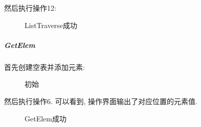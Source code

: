 \documentclass[supercite]{Experimental_Report}
\theoremstyle{definition}
\begin{document}
\clearpage
\noindent
然后执行操作12:
\begin{figure}[htbp]
	\centering
	\centering
	\caption{ListTraverse成功}
	\label{fig1-21}
\end{figure}

\subparagraph{GetElem}
\noindent
首先创建空表并添加元素:
\begin{figure}[htbp]
	\centering
	\centering
	\centering
	\caption{初始}
	\label{fig1-22}
\end{figure}

\noindent
然后执行操作6. 可以看到, 操作界面输出了对应位置的元素值.
\begin{figure}[htbp]
	\centering
	\centering
	\caption{GetElem成功}
	\label{fig1-23}
\end{figure}
\end{document}
